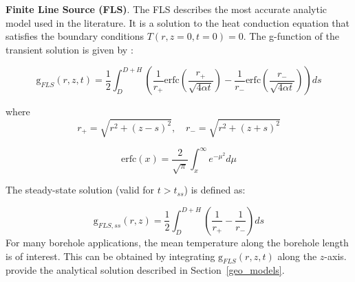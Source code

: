 \textbf{Finite Line Source (FLS)}. 
The FLS describes the most accurate analytic model used in the literature. It is a solution to the heat conduction equation that satisfies the boundary conditions $T(r, z=0, t=0) = 0$. The g-function of the transient solution is given by \citep{pahud_geothermal_2002}:

\begin{equation}
\label{eq:FLS}
    \mathrm{g}_{FLS}(r, z, t) = \frac{1}{2} \int_{D}^{D+H} \left( \frac{1}{r_+} \mathrm{erfc}\left(\frac{r_+}{\sqrt{4 \alpha t}}\right) - \frac{1}{r_-}\mathrm{erfc}\left(\frac{r_-}{\sqrt{4 \alpha t}}\right) \right) ds
\end{equation}

where
\begin{equation*}
    r_+ = \sqrt{r^2 + (z - s)^2}, \quad r_- = \sqrt{r^2 + (z + s)^2}
\end{equation*}

\begin{equation*}
   \mathrm{erfc}(x) = \frac{2}{\sqrt{\pi}} \int_{x}^{\infty} e^{-\mu^2} d\mu
\end{equation*}

The steady-state solution (valid for $t > t_{ss}$) is defined as:

\begin{equation}
\label{eq:FLS_ss}
    \mathrm{g}_{FLS,ss}(r, z) = \frac{1}{2} \int_{D}^{D+H} \left( \frac{1}{r_+} - \frac{1}{r_-} \right) ds
\end{equation}
For many borehole applications, the mean temperature along the borehole length is of interest. This can be obtained by integrating $\mathrm{g}_{FLS}(r, z, t) $ along the $z$-axis. \citet{claesson_analytical_2011} provide the analytical solution described in Section~\ref{geo_models}.

\begin{comment}

\begin{equation}
\label{eq:FLS_int}
    \mathrm{g}_{FLS}(r, \overline{z}, t) = \frac{1}{2} \int_{\frac{1}{\sqrt{4 \alpha t}}}^{\infty}  e^{- r^2 s^2} \ \frac{I_{ls}(Hs, Ds)}{H s^2} \ ds
\end{equation}

where
\begin{equation*}
    I_{ls}(h, d) = 2\ \mathrm{ierf}(h) + 2\ \mathrm{ierf}(h + 2d) - \mathrm{ierf}(2h + 2d) - \mathrm{ierf}(2d)
\end{equation*}

\begin{equation*}
    \mathrm{ierf}(x) = \int_0^x \mathrm{erf}(u) du 
                     = x \ \mathrm{erf}(x) - \frac{1}{\sqrt{\pi}} (1 - e^{-x^2})
    \qquad
    \mathrm{erf}(x) = \frac{2}{\sqrt{\pi}} \int_0^x e^{-\mu^2} d \mu 
\end{equation*}

\\
The FLS can be simplified under certain assumptions by simpler models, namely the infinite line source model (ILS) and an asymptotic approximation of the FLS model, here referred to as Eskilson's approximation (Esk). A comparison of all methods is provided in Section~\ref{comparison}.
\\
\end{comment}

